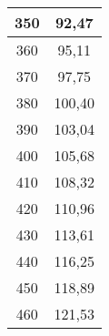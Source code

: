 \documentclass[10pt]{article}
\begin{document}
\begin{table}[!ht]
\begin{tabular}{|c|c|}
      350 & 92,47 \\ \hline
      360 & 95,11 \\ \hline
      370 & 97,75 \\ \hline
      380 & 100,40 \\ \hline
      390 & 103,04 \\ \hline
      400 & 105,68 \\ \hline
      410 & 108,32 \\ \hline
      420 & 110,96 \\ \hline
      430 & 113,61 \\ \hline
      440 & 116,25 \\ \hline
      450 & 118,89 \\ \hline
      460 & 121,53 \\ \hline
  \end{tabular}
\end{table}

\newpage
\end{document}

